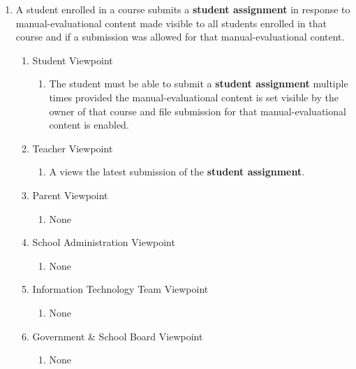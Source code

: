 \documentclass[]{article}
\begin{document}
\begin{enumerate}[{BE}1.]
	\item A student enrolled in a course submits a \textbf{student assignment} in
response to manual-evaluational content made visible to all students enrolled in
that course and if a submission was allowed for that manual-evaluational
content.
	\begin{enumerate}[{VP2}.1]
		\item Student Viewpoint
			\begin{enumerate}
				\item The student must be able to submit a \textbf{student assignment}
multiple times provided the manual-evaluational content is set visible by the
owner of that course and file submission for that manual-evaluational content is
enabled.
			\end{enumerate}
		\item Teacher Viewpoint
			\begin{enumerate}
				\item A views the latest submission of the \textbf{student assignment}.
			\end{enumerate}
		\item Parent Viewpoint
			\begin{enumerate}
				\item None
			\end{enumerate}
		\item School Administration Viewpoint
			\begin{enumerate}
				\item None
			\end{enumerate}
		\item Information Technology Team Viewpoint
			\begin{enumerate}
				\item None
			\end{enumerate}
		\item Government \& School Board Viewpoint
			\begin{enumerate}
				\item None
			\end{enumerate}
	\end{enumerate}


\end{enumerate}
\end{document}
